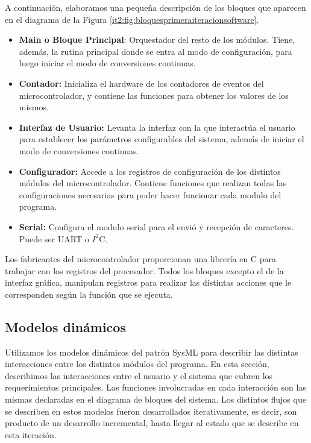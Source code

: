 A continuación, elaboramos una pequeña descripción de los bloques que aparecen en el diagrama de la Figura \ref{it2:fig:bloquesprimeraiteracionsoftware}.

\begin{itemize}
  \item \textbf{Main o Bloque Principal}: Orquestador del resto de los módulos. Tiene, además, la rutina principal donde se entra al modo de configuración, para luego iniciar el modo de conversiones continuas.
  \item \textbf{Contador:} Inicializa el hardware de los contadores de eventos del microcontrolador, y contiene las funciones para obtener los valores de los mismos.
  \item \textbf{Interfaz de Usuario:} Levanta la interfaz con la que interactúa el usuario para establecer los parámetros configurables del sistema, además de iniciar el modo de conversiones continuas.
  \item \textbf{Configurador:} Accede a los registros de configuración de los distintos módulos del microcontrolador. Contiene funciones que realizan todas las configuraciones necesarias para poder hacer funcionar cada modulo del programa.
  \item \textbf{Serial:} Configura el modulo serial para el envió y recepción de caracteres. Puede ser UART o $I^{2}$C.
\end{itemize}


Los fabricantes del microcontrolador proporcionan una librería en C para trabajar con los registros del procesador. Todos los bloques excepto el de la interfaz gráfica, manipulan registros para realizar las distintas acciones que le corresponden según la función que se ejecuta.  


\subsection{Modelos dinámicos} %
\label{it2:sub:modelos_dinamicos}

Utilizamos los modelos dinámicos del patrón SysML para describir las distintas interacciones entre los distintos módulos del programa. En esta sección, describimos las interacciones entre el usuario y el sistema que cubren los requerimientos principales. Las funciones involucradas en cada interacción son las mismas declaradas en el diagrama de bloques del sistema. Los distintos flujos que se describen en estos modelos fueron desarrollados iterativamente, es decir, son producto de un desarrollo incremental, hasta llegar al estado que se describe en esta iteración. \\

